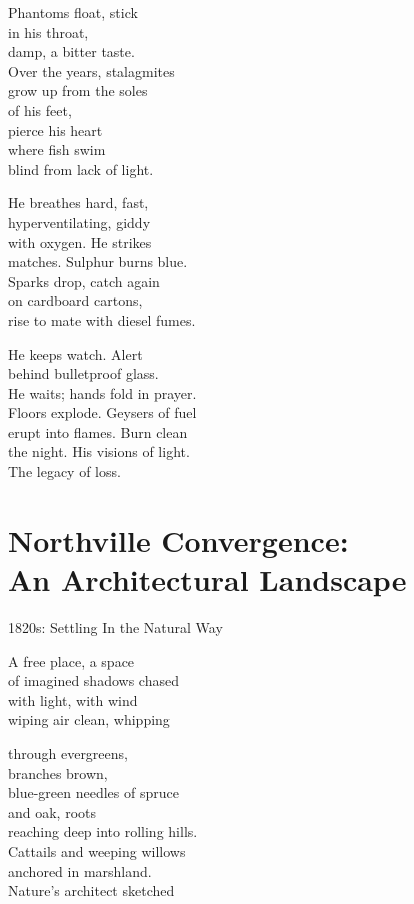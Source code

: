 \documentclass[twoside,10pt]{book}
\begin{document}
Phantoms float, stick\\
in his throat,\\
damp, a bitter taste.\\
Over the years, stalagmites\\
grow up from the soles\\
of his feet,\\
pierce his heart\\
where fish swim\\
blind from lack of light.

He breathes hard, fast,\\
hyperventilating, giddy\\
with oxygen. He strikes\\
matches. Sulphur burns blue.\\
Sparks drop, catch again\\
on cardboard cartons,\\
rise to mate with diesel fumes.

He keeps watch. Alert\\
behind bulletproof glass.\\
He waits; hands fold in prayer.\\
Floors explode. Geysers of fuel\\
erupt into flames. Burn clean\\
the night. His visions of light.\\
The legacy of loss.


\clearpage
\section{Northville Convergence:\\
  An Architectural Landscape}

1820s: Settling In the Natural Way

A free place, a space\\
of imagined shadows chased\\
with light, with wind\\
wiping air clean, whipping

through evergreens,\\
branches brown,\\
blue-green needles of spruce\\
and oak, roots\\
reaching deep into rolling hills.\\
Cattails and weeping willows\\
anchored in marshland.\\
Nature's architect sketched
\end{document}
